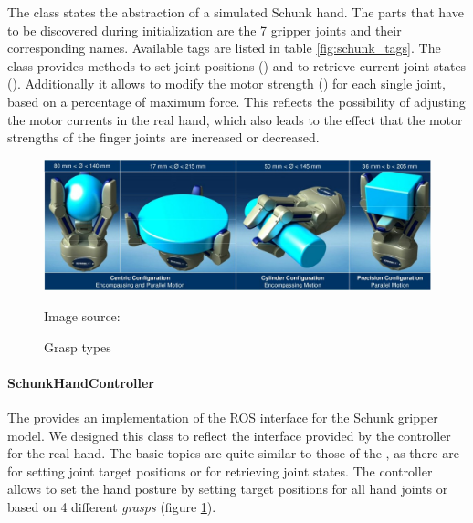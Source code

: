 The  class states the abstraction of a simulated Schunk hand. The parts that have to be discovered during initialization are the 7 gripper joints and their corresponding names. Available tags are listed in table \ref{fig:schunk_tags}. The  class provides methods to set joint positions () and to retrieve current joint states (). Additionally it allows to modify the motor strength () for each single joint, based on a percentage of maximum force. This reflects the possibility of adjusting the motor currents in the real hand, which also leads to the effect that the motor strengths of the finger joints are increased or decreased.

\begin{figure}[h]
	\centering
  	\includegraphics[width=1.0\textwidth]{images/grasp_types.jpg}
	\caption{Grasp types}
	{\scriptsize Image source: \cite{schunk2010}}
	\label{fig:grasp_types}
\end{figure}

\paragraph{SchunkHandController}

The  provides an implementation of the ROS interface for the Schunk gripper model. We designed this class to reflect the interface provided by the controller for the real hand. The basic topics are quite similar to those of the , as there are  for setting joint target positions or  for retrieving joint states. The controller allows to set the hand posture by setting target positions for all hand joints or based on 4 different \emph{grasps} (figure \ref{fig:grasp_types}). \\

